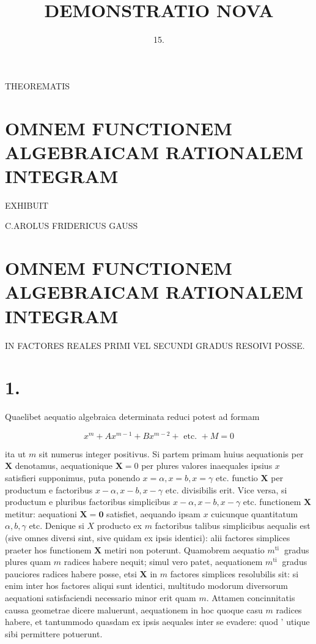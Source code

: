 \documentclass[10pt]{article}
\title{DEMONSTRATIO NOVA }
\author{15.}
\date{}
\begin{document}
\maketitle
THEOREMATIS

\section*{OMNEM FUNCTIONEM ALGEBRAICAM RATIONALEM INTEGRAM}
EXHIBUIT

C.AROLUS FRIDERICUS GAUSS

\section*{OMNEM FUNCTIONEM ALGEBRAICAM RATIONALEM INTEGRAM }
IN FACTORES REALES PRIMI VEL SECUNDI GRADUS RESOIVI POSSE.

\section*{1.}
Quaelibet aequatio algebraica determinata reduci potest ad formam

\[
x^{m}+A x^{m-1}+B x^{m-2}+\text { etc. }+M=0
\]

ita ut \(m\) sit numerus integer positivus. Si partem primam huius aequationis per \(\boldsymbol{X}\) denotamus, aequationique \(\mathbf{X}=0\) per plures valores inaequales ipsius \(x\) satisfieri supponimus, puta ponendo \(x=\alpha, x=b, x=\gamma\) etc. functio \(\boldsymbol{X}\) per productum e factoribus \(x-\alpha, x-b, x-\gamma\) etc. divisibilis erit. Vice versa, si productum e pluribus factoribus simplicibus \(x-\alpha, x-b, x-\gamma\) etc. functionem \(\boldsymbol{X}\) metitur: aequationi \(\boldsymbol{X}=\mathbf{0}\) satisfiet, aequando ipsam \(x\) cuicunque quantitatum \(\alpha, b, \gamma\) etc. Denique si \(X\) producto ex \(m\) factoribus talibus simplicibus aequalis est (sive omnes diversi sint, sive quidam ex ipsis identici): alii factores simplices praeter hos functionem \(\boldsymbol{X}\) metiri non poterunt. Quamobrem aequatio \(m^{\text {ti }}\) gradus plures quam \(m\) radices habere nequit; simul vero patet, aequationem \(m^{\text {ti }}\) gradus pauciores radices habere posse, etsi \(\mathbf{X}\) in \(m\) factores simplices resolubilis sit: si enim inter hos factores aliqui sunt identici, multitudo modorum diversorum aequationi satisfaciendi necessario minor erit quam \(m\). Attamen concinnitatis caussa geometrae dicere maluerunt, aequationem in hoc quoque casu \(m\) radices habere, et tantummodo quasdam ex ipsis aequales inter se evadere: quod ' utique sibi permittere potuerunt.
\end{document}
